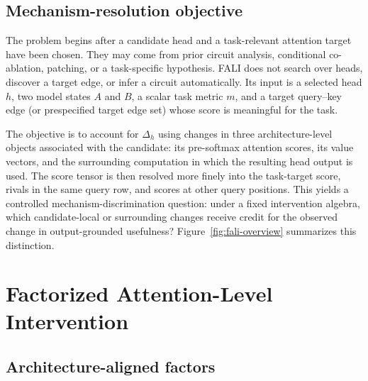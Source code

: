 \documentclass[pdflatex,sn-mathphys-ay]{sn-jnl}
\begin{document}
\subsection{Mechanism-resolution objective}\label{sec:mechanism-objective}

The problem begins after a candidate head and a task-relevant attention target have been chosen. They may come from prior circuit analysis, conditional co-ablation, patching, or a task-specific hypothesis. FALI does not search over heads, discover a target edge, or infer a circuit automatically. Its input is a selected head $h$, two model states $A$ and $B$, a scalar task metric $m$, and a target query--key edge (or prespecified target edge set) whose score is meaningful for the task.

The objective is to account for $\Delta_h$ using changes in three architecture-level objects associated with the candidate: its pre-softmax attention scores, its value vectors, and the surrounding computation in which the resulting head output is used. The score tensor is then resolved more finely into the task-target score, rivals in the same query row, and scores at other query positions. This yields a controlled mechanism-discrimination question: under a fixed intervention algebra, which candidate-local or surrounding changes receive credit for the observed change in output-grounded usefulness? Figure~\ref{fig:fali-overview} summarizes this distinction.



\section{Factorized Attention-Level Intervention}\label{sec:fali}

\subsection{Architecture-aligned factors}\label{sec:factors}
\end{document}
